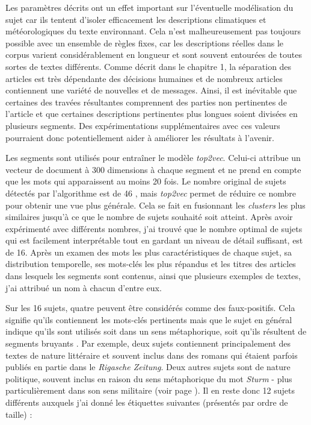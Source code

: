 \documentclass[a4paper,twoside,12pt]{article}
\begin{document}
Les paramètres décrits ont un effet important sur l'éventuelle modélisation du sujet car ils tentent d'isoler efficacement les descriptions climatiques et météorologiques du texte environnant. Cela n'est malheureusement pas toujours possible avec un ensemble de règles fixes, car les descriptions réelles dans le corpus varient considérablement en longueur et sont souvent entourées de toutes sortes de textes différents. Comme décrit dans le chapitre 1, la séparation des articles est très dépendante des décisions humaines et de nombreux articles contiennent une variété de nouvelles et de messages. Ainsi, il est inévitable que certaines des travées résultantes comprennent des parties non pertinentes de l'article et que certaines descriptions pertinentes plus longues soient divisées en plusieurs segments. Des expérimentations supplémentaires avec ces valeurs pourraient donc potentiellement aider à améliorer les résultats à l'avenir.

Les segments sont utilisés pour entraîner le modèle \textit{top2vec}. Celui-ci attribue un vecteur de document à 300 dimensions à chaque segment et ne prend en compte que les mots qui apparaissent au moins 20 fois. Le nombre original de sujets détectés par l'algorithme est de 46 \label{46_topics}, mais \textit{top2vec} permet de réduire ce nombre pour obtenir une vue plus générale. Cela se fait en fusionnant les \textit{clusters} les plus similaires jusqu'à ce que le nombre de sujets souhaité soit atteint. Après avoir expérimenté avec différents nombres, j'ai trouvé que le nombre optimal de sujets qui est facilement interprétable tout en gardant un niveau de détail suffisant, est de 16. Après un examen des mots les plus caractéristiques de chaque sujet, sa distribution temporelle, ses mots-clés les plus répandus et les titres des articles dans lesquels les segments sont contenus, ainsi que plusieurs exemples de textes, j'ai attribué un nom à chacun d'entre eux.

Sur les 16 sujets, quatre peuvent être considérés comme des faux-positifs. Cela signifie qu'ils contiennent les mots-clés pertinents mais que le sujet en général indique qu'ils sont utilisés soit dans un sens métaphorique, soit qu'ils résultent de segments \og bruyants \fg{}. Par exemple, deux sujets contiennent principalement des textes de nature littéraire et souvent inclus dans des romans qui étaient parfois publiés en partie dans le \textit{Rigasche Zeitung}. Deux autres sujets sont de nature politique, souvent inclus en raison du sens métaphorique du mot \textit{Sturm} - plus particulièrement dans son sens militaire (voir page \pageref{fig:sturm_wordclouds}). Il en reste donc 12 sujets différents auxquels j'ai donné les étiquettes suivantes (présentés par ordre de taille) :
\end{document}
